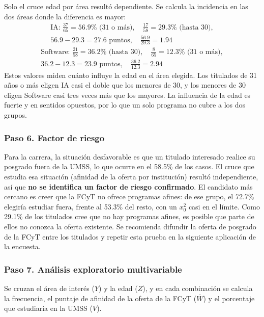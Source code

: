 \documentclass[12pt, a4paper]{article}
\begin{document}
Solo el cruce edad por área resultó dependiente. Se calcula la
incidencia en las dos áreas donde la diferencia es mayor:
\begin{gather*}
\text{IA: } \frac{37}{65} = 56.9\% \text{ (31 o más)}, \quad \frac{17}{58} = 29.3\% \text{ (hasta 30)}, \\
56.9 - 29.3 = 27.6 \text{ puntos}, \quad \frac{56.9}{29.3} = 1.94
\end{gather*}
\begin{gather*}
\text{Software: } \frac{21}{58} = 36.2\% \text{ (hasta 30)}, \quad \frac{8}{65} = 12.3\% \text{ (31 o más)}, \\
36.2 - 12.3 = 23.9 \text{ puntos}, \quad \frac{36.2}{12.3} = 2.94
\end{gather*}
Estos valores miden cuánto influye la edad en el área elegida. Los
titulados de 31 años o más eligen IA casi el doble que los menores de 30,
y los menores de 30 eligen Software casi tres veces más que los mayores.
La influencia de la edad es fuerte y en sentidos opuestos, por lo que un
solo programa no cubre a los dos grupos.

\subsubsection{Paso 6. Factor de riesgo}

Para la carrera, la situación desfavorable es que un titulado interesado
realice su posgrado fuera de la UMSS, lo que ocurre en el 58.5\% de los
casos. El cruce que estudia esa situación (afinidad de la oferta por
institución) resultó independiente, así que \textbf{no se identifica un
factor de riesgo confirmado}. El candidato más cercano es creer que la
FCyT no ofrece programas afines: de ese grupo, el 72.7\% elegiría estudiar
fuera, frente al 53.3\% del resto, con un $x_0^2$ casi en el límite. Como
29.1\% de los titulados cree que no hay programas afines, es posible que
parte de ellos no conozca la oferta existente. Se recomienda difundir la
oferta de posgrado de la FCyT entre los titulados y repetir esta prueba
en la siguiente aplicación de la encuesta.

\subsubsection{Paso 7. Análisis exploratorio multivariable}

Se cruzan el área de interés ($Y$) y la edad ($Z$), y en cada combinación
se calcula la frecuencia, el puntaje de afinidad de la oferta de la FCyT
($\bar{W}$) y el porcentaje que estudiaría en la UMSS ($V$).
\end{document}
